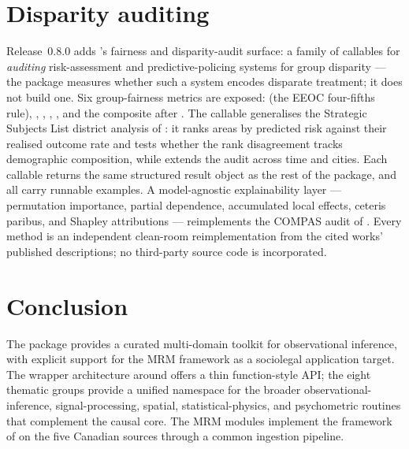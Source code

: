 \documentclass[article,shortnames,nojss]{jss}
\begin{document}
\section{Disparity auditing}
\label{sec:fairness}

Release~0.8.0 adds 's fairness and disparity-audit surface:
a family of callables for \emph{auditing} risk-assessment and
predictive-policing systems for group disparity --- the package
measures whether such a system encodes disparate treatment; it does
not build one.  Six group-fairness metrics are exposed:
 (the EEOC four-fifths rule),
, ,
, , and
the composite  after
\citet{Barman2026PredictivePolicingBias}.  The
 callable generalises the Strategic
Subjects List district analysis of \citet{Lacherade2021PredPolChicago}:
it ranks areas by predicted risk against their realised outcome rate
and tests whether the rank disagreement tracks demographic
composition, while  extends the audit
across time and cities.  Each callable returns the same structured
result object as the rest of the package, and all carry runnable
examples.  A model-agnostic explainability layer --- permutation
importance, partial dependence, accumulated local effects, ceteris
paribus, and Shapley attributions --- reimplements the COMPAS audit of
\citet{Biecek2021XAIStories}.  Every method is an independent
clean-room reimplementation from the cited works' published
descriptions; no third-party source code is incorporated.

\section{Conclusion}
\label{sec:conclusion}

The  package  provides a curated
multi-domain toolkit for observational inference, with explicit
support for the MRM framework as a sociolegal application target.
The wrapper architecture around  offers a thin
function-style API; the eight thematic groups provide a unified
namespace for the broader observational-inference, signal-processing,
spatial, statistical-physics, and psychometric routines that
complement the causal core. The MRM modules implement the
framework of \citet{Ruhela2026MRM} on the five Canadian sources
through a common ingestion pipeline.
\end{document}
